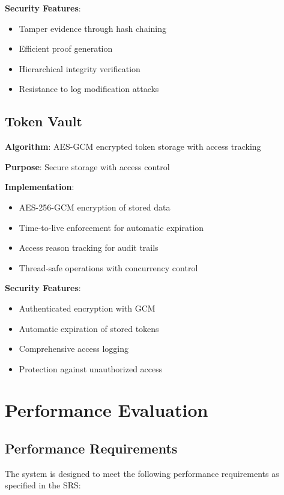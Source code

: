 \documentclass[12pt]{article}
\begin{document}
\textbf{Security Features}:
\begin{itemize}
    \item Tamper evidence through hash chaining
    \item Efficient proof generation
    \item Hierarchical integrity verification
    \item Resistance to log modification attacks
\end{itemize}

\subsection{Token Vault}

\textbf{Algorithm}: AES-GCM encrypted token storage with access tracking

\textbf{Purpose}: Secure storage with access control

\textbf{Implementation}:
\begin{itemize}
    \item AES-256-GCM encryption of stored data
    \item Time-to-live enforcement for automatic expiration
    \item Access reason tracking for audit trails
    \item Thread-safe operations with concurrency control
\end{itemize}

\textbf{Security Features}:
\begin{itemize}
    \item Authenticated encryption with GCM
    \item Automatic expiration of stored tokens
    \item Comprehensive access logging
    \item Protection against unauthorized access
\end{itemize}

\section{Performance Evaluation}

\subsection{Performance Requirements}

The system is designed to meet the following performance requirements as specified in the SRS:
\end{document}
